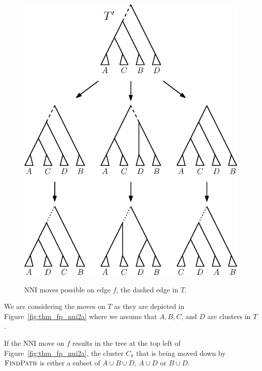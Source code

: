 \documentclass{amsart}
\newcommand{\findpath}{\textsc{FindPath}}
\newcommand{\nni}{\mathrm{NNI}}
\begin{document}
\begin{enumerate}
\begin{figure}[!hbt]
\begin{minipage}{0.45\textwidth}
            \includegraphics[width=0.9\linewidth]{thm_fp_nni2b.eps}
            \vspace{12pt}
            \label{fig:thm_fp_nni2b}
            \caption{$\nni$ moves possible on edge $f$, the dashed edge in $T$.}
        \end{minipage}
    \end{figure}

    We are considering the moves on $T$ as they are depicted in Figure~\ref{fig:thm_fp_nni2a} where we assume that $A, B, C$, and $D$ are clusters in $T$.

    If the $\nni$ move on $f$ results in the tree at the top left of Figure~\ref{fig:thm_fp_nni2a}, the cluster $C_k$ that is being moved down by $\findpath$ is either a subset of $A \cup B \cup D$, $A \cup D$ or $B \cup D$.


\end{enumerate}
\end{document}

